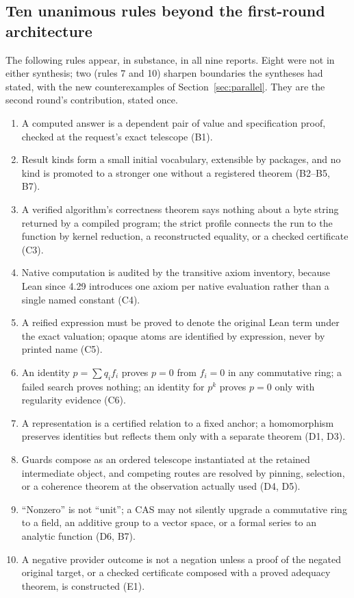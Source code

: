 \documentclass[11pt,a4paper]{article}
\theoremstyle{definition}
\begin{document}
\subsection{Ten unanimous rules beyond the first-round architecture}
The following rules appear, in substance, in all nine reports. Eight were not in either synthesis; two (rules 7 and 10) sharpen boundaries the syntheses had stated, with the new counterexamples of Section~\ref{sec:parallel}. They are the second round's contribution, stated once.
\begin{enumerate}[label=\arabic*.]
\item A computed answer is a dependent pair of value and specification proof, checked at the request's exact telescope (B1).
\item Result kinds form a small initial vocabulary, extensible by packages, and no kind is promoted to a stronger one without a registered theorem (B2--B5, B7).
\item A verified algorithm's correctness theorem says nothing about a byte string returned by a compiled program; the strict profile connects the run to the function by kernel reduction, a reconstructed equality, or a checked certificate (C3).
\item Native computation is audited by the transitive axiom inventory, because Lean since 4.29 introduces one axiom per native evaluation rather than a single named constant (C4).
\item A reified expression must be proved to denote the original Lean term under the exact valuation; opaque atoms are identified by expression, never by printed name (C5).
\item An identity $p=\sum q_i f_i$ proves $p=0$ from $f_i=0$ in any commutative ring; a failed search proves nothing; an identity for $p^k$ proves $p=0$ only with regularity evidence (C6).
\item A representation is a certified relation to a fixed anchor; a homomorphism preserves identities but reflects them only with a separate theorem (D1, D3).
\item Guards compose as an ordered telescope instantiated at the retained intermediate object, and competing routes are resolved by pinning, selection, or a coherence theorem at the observation actually used (D4, D5).
\item ``Nonzero'' is not ``unit''; a CAS may not silently upgrade a commutative ring to a field, an additive group to a vector space, or a formal series to an analytic function (D6, B7).
\item A negative provider outcome is not a negation unless a proof of the negated original target, or a checked certificate composed with a proved adequacy theorem, is constructed (E1).
\end{enumerate}
\end{document}
